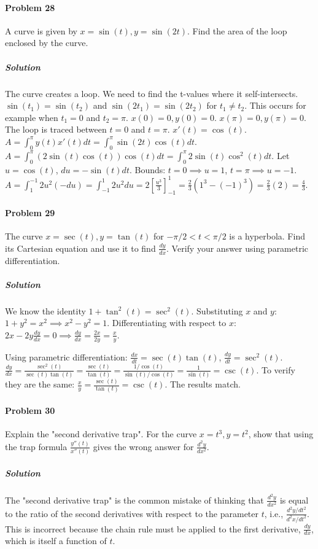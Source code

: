 \documentclass{article}
\begin{document}
\paragraph{Problem 28}
A curve is given by $x=\sin(t), y=\sin(2t)$. Find the area of the loop enclosed by the curve.

\subparagraph{Solution}
The curve creates a loop. We need to find the t-values where it self-intersects.
$\sin(t_1)=\sin(t_2)$ and $\sin(2t_1)=\sin(2t_2)$ for $t_1 \neq t_2$.
This occurs for example when $t_1=0$ and $t_2=\pi$.
$x(0)=0, y(0)=0$. $x(\pi)=0, y(\pi)=0$. The loop is traced between $t=0$ and $t=\pi$.
$x'(t) = \cos(t)$.
$A = \int_0^\pi y(t)x'(t) dt = \int_0^\pi \sin(2t)\cos(t) dt$.
$A = \int_0^\pi (2\sin(t)\cos(t))\cos(t) dt = \int_0^\pi 2\sin(t)\cos^2(t) dt$.
Let $u=\cos(t)$, $du=-\sin(t)dt$.
Bounds: $t=0 \implies u=1$, $t=\pi \implies u=-1$.
$A = \int_1^{-1} 2u^2 (-du) = \int_{-1}^1 2u^2 du = 2[\frac{u^3}{3}]_{-1}^1 = \frac{2}{3}(1^3 - (-1)^3) = \frac{2}{3}(2) = \frac{4}{3}$.

\paragraph{Problem 29}
The curve $x = \sec(t), y=\tan(t)$ for $-\pi/2 < t < \pi/2$ is a hyperbola. Find its Cartesian equation and use it to find $\frac{dy}{dx}$. Verify your answer using parametric differentiation.

\subparagraph{Solution}
We know the identity $1+\tan^2(t) = \sec^2(t)$.
Substituting $x$ and $y$: $1+y^2=x^2 \implies x^2 - y^2 = 1$.
Differentiating with respect to $x$: $2x - 2y\frac{dy}{dx} = 0 \implies \frac{dy}{dx} = \frac{2x}{2y} = \frac{x}{y}$.

Using parametric differentiation:
$\frac{dx}{dt} = \sec(t)\tan(t)$, $\frac{dy}{dt} = \sec^2(t)$.
$\frac{dy}{dx} = \frac{\sec^2(t)}{\sec(t)\tan(t)} = \frac{\sec(t)}{\tan(t)} = \frac{1/\cos(t)}{\sin(t)/\cos(t)} = \frac{1}{\sin(t)} = \csc(t)$.
To verify they are the same: $\frac{x}{y} = \frac{\sec(t)}{\tan(t)} = \csc(t)$. The results match.

\paragraph{Problem 30}
Explain the "second derivative trap". For the curve $x=t^3, y=t^2$, show that using the trap formula $\frac{y''(t)}{x''(t)}$ gives the wrong answer for $\frac{d^2y}{dx^2}$.

\subparagraph{Solution}
The "second derivative trap" is the common mistake of thinking that $\frac{d^2y}{dx^2}$ is equal to the ratio of the second derivatives with respect to the parameter $t$, i.e., $\frac{d^2y/dt^2}{d^2x/dt^2}$. This is incorrect because the chain rule must be applied to the first derivative, $\frac{dy}{dx}$, which is itself a function of $t$.
\end{document}
